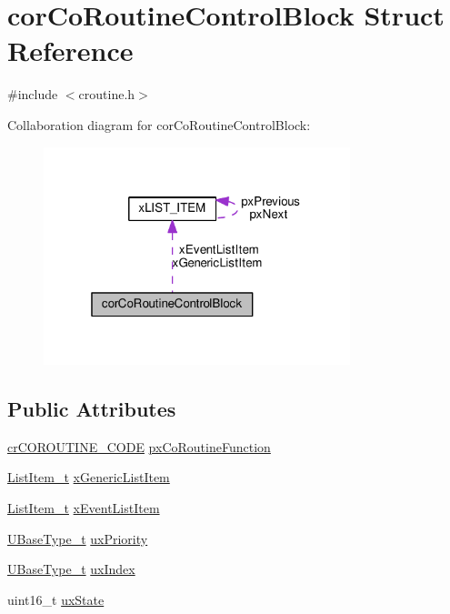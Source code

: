\hypertarget{structcor_co_routine_control_block}{}\section{cor\+Co\+Routine\+Control\+Block Struct Reference}
\label{structcor_co_routine_control_block}


{\ttfamily \#include $<$croutine.\+h$>$}



Collaboration diagram for cor\+Co\+Routine\+Control\+Block\+:\nopagebreak
\begin{figure}[H]
\begin{center}
\leavevmode
\includegraphics[width=253pt]{structcor_co_routine_control_block__coll__graph}
\end{center}
\end{figure}
\subsection*{Public Attributes}
\begin{DoxyCompactItemize}
\item 
\hyperlink{croutine_8h_a397a7505718dd366d8411ce324c49758}{cr\+C\+O\+R\+O\+U\+T\+I\+N\+E\+\_\+\+C\+O\+DE} \hyperlink{structcor_co_routine_control_block_acc98c7364cd88e8e034a5f9bba113832}{px\+Co\+Routine\+Function}
\item 
\hyperlink{list_8h_a1a62d469392f9bfe2443e7efab9c8398}{List\+Item\+\_\+t} \hyperlink{structcor_co_routine_control_block_aa2900494db8782eeb8ef12d482501406}{x\+Generic\+List\+Item}
\item 
\hyperlink{list_8h_a1a62d469392f9bfe2443e7efab9c8398}{List\+Item\+\_\+t} \hyperlink{structcor_co_routine_control_block_a105d316da0069f766acc3b210afed1b9}{x\+Event\+List\+Item}
\item 
\hyperlink{portmacro_8h_a646f89d4298e4f5afd522202b11cb2e6}{U\+Base\+Type\+\_\+t} \hyperlink{structcor_co_routine_control_block_a752101a5d41b5caa7fd5149436613c8f}{ux\+Priority}
\item 
\hyperlink{portmacro_8h_a646f89d4298e4f5afd522202b11cb2e6}{U\+Base\+Type\+\_\+t} \hyperlink{structcor_co_routine_control_block_a6c185cd2145f562fb570bea9b158fc81}{ux\+Index}
\item 
uint16\+\_\+t \hyperlink{structcor_co_routine_control_block_aa0d702ff5a23c61598fe13e5a78fb1dc}{ux\+State}
\end{DoxyCompactItemize}


